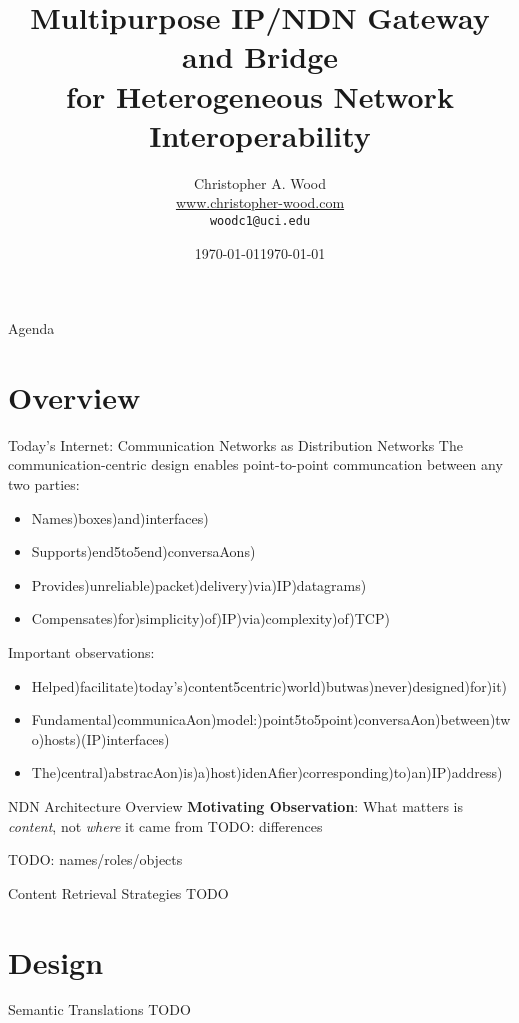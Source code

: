 \documentclass[handout]{beamer}
\title[NDN Gateway]{Multipurpose IP/NDN Gateway and Bridge \\ for Heterogeneous Network Interoperability}
\institute[Donald Bren School of Information and Computer Sciences \\ UC Irvine]{}
\date{\today}
\author[Christopher A. Wood]{Christopher A. Wood \\ \url{www.christopher-wood.com} \\ {\tt woodc1@uci.edu}}
\date{\today}
\begin{document}

\begin{frame}
	\titlepage
\end{frame}

\begin{frame}{Agenda}
	\tableofcontents
\end{frame}


\section{Overview}
\begin{frame}{Today's Internet: Communication Networks as Distribution Networks}
	The communication-centric design enables point-to-point communcation between any two parties:
	\begin{itemize}
		\item Names)boxes)and)interfaces)
		\item Supports)end5to5end)conversaAons)
		\item Provides)unreliable)packet)delivery)via)IP)datagrams)
		\item Compensates)for)simplicity)of)IP)via)complexity)of)TCP)
	\end{itemize}

	Important observations:
	\begin{itemize}
		\item Helped)facilitate)today’s)content5centric)world)butwas)never)designed)for)it)
		\item Fundamental)communicaAon)model:)point5to5point)conversaAon)between)two)hosts)(IP)interfaces)
		\item The)central)abstracAon)is)a)host)idenAﬁer)corresponding)to)an)IP)address)
	\end{itemize}
\end{frame}

\begin{frame}{NDN Architecture Overview}
	{\bf Motivating Observation}: What matters is \emph{content}, not \emph{where} it came from
	TODO: differences

	TODO: names/roles/objects
\end{frame}

\begin{frame}{Content Retrieval Strategies}
	TODO
\end{frame}

\section{Design}
\begin{frame}{Semantic Translations}
	TODO
\end{frame}
\end{document}
